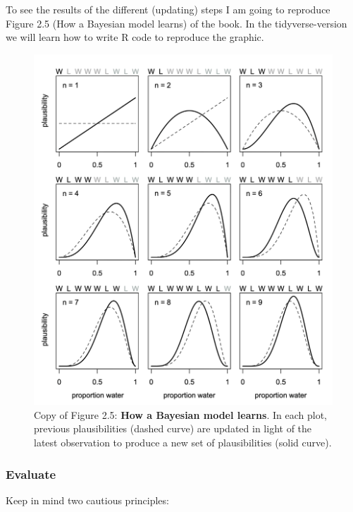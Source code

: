 \documentclass[
  letterpaper,
  DIV=11,
  numbers=noendperiod]{scrreprt}
\begin{document}
To see the results of the different (updating) steps I am going to
reproduce Figure 2.5 (How a Bayesian model learns) of the book. In the
tidyverse-version we will learn how to write R code to reproduce the
graphic.

\begin{figure}

{\centering \includegraphics{img/bayesian_model_learns_step_by_step-min.png}

}

\caption{\label{fig-2-5-book-copy}Copy of Figure 2.5: \textbf{How a
Bayesian model learns}. In each plot, previous plausibilities (dashed
curve) are updated in light of the latest observation to produce a new
set of plausibilities (solid curve).}

\end{figure}

\hypertarget{evaluate}{%
\subsubsection{Evaluate}\label{evaluate}}

Keep in mind two cautious principles:
\end{document}
